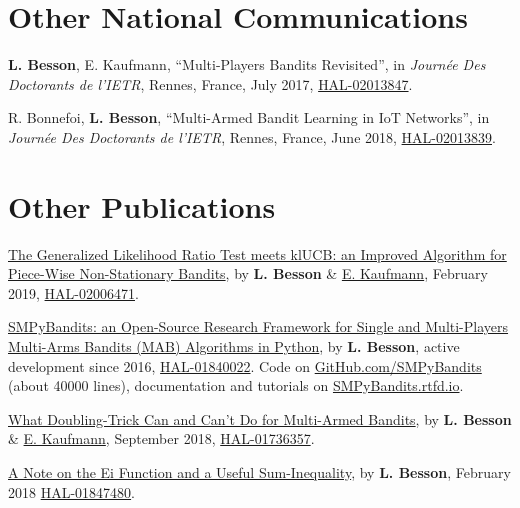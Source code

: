 \section*{Other National Communications}
\renewcommand{\labelenumi}{[ONC-\arabic{enumi}]}
\begin{etaremune}
  \item \textbf{L. Besson}, E. Kaufmann, ``Multi-Players Bandits Revisited'', in \emph{Journ\'{e}e Des Doctorants de l'IETR}, Rennes, France, July 2017, \href{https://hal.inria.fr/hal-02013847}{HAL-02013847}.
  \item R. Bonnefoi, \textbf{L. Besson}, ``Multi-Armed Bandit Learning in IoT Networks'', in \emph{Journ\'{e}e Des Doctorants de l'IETR}, Rennes, France, June 2018, \href{https://hal.inria.fr/hal-02013839}{HAL-02013839}.
\end{etaremune}


\section*{Other Publications}
\renewcommand{\labelenumi}{[OP-\arabic{enumi}]}
\begin{etaremune}
\item
  \href{https://hal.inria.fr/hal-02006471/document}{The Generalized Likelihood Ratio Test meets klUCB: an Improved Algorithm for Piece-Wise Non-Stationary Bandits}, by \textbf{L. Besson} \&
  \href{http://chercheurs.lille.inria.fr/ekaufman/research.html}{E.
  Kaufmann}, February 2019,
  \href{https://hal.inria.fr/hal-02006471}{HAL-02006471}.
  \cite{Besson2019GLRT}
\item
  \href{https://hal.inria.fr/hal-01840022/document}{SMPyBandits: an
  Open-Source Research Framework for Single and Multi-Players Multi-Arms
  Bandits (MAB) Algorithms in Python}, by \textbf{L. Besson},
  active development since 2016,
  \href{https://hal.inria.fr/hal-01840022}{HAL-01840022}. Code on
  \href{https://GitHub.com/SMPyBandits/SMPyBandits}{GitHub.com/SMPyBandits}
  (about 40000 lines), documentation and tutorials on
  \href{https://SMPyBandits.rtfd.io}{SMPyBandits.rtfd.io}.
  \cite{SMPyBandits,SMPyBanditsJMLR}
\item
  \href{https://hal.inria.fr/hal-01736357/document}{What Doubling-Trick
  Can and Can't Do for Multi-Armed Bandits}, by \textbf{L. Besson} \&
  \href{http://chercheurs.lille.inria.fr/ekaufman/research.html}{E.
  Kaufmann}, September 2018,
  \href{https://hal.inria.fr/hal-01736357}{HAL-01736357}.
  \cite{Besson2018DoublingTricks}
\item
  \href{https://hal.inria.fr/hal-01847480/document}{A Note on the Ei
  Function and a Useful Sum-Inequality}, by \textbf{L. Besson}, February
  2018 \href{https://hal.inria.fr/hal-01847480}{HAL-01847480}.
\end{etaremune}


